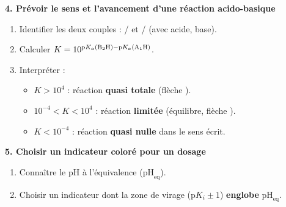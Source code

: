 \documentclass[11pt]{article}
\begin{document}
\begin{methode}
\textbf{4. Prévoir le sens et l'avancement d'une réaction acido-basique}
\begin{enumerate}
  \item Identifier les deux couples : / et / (avec  acide,  base).
  \item Calculer $K = 10^{\mathrm{p}K_{a}(\ce{B2H}) - \mathrm{p}K_{a}(\ce{A1H})}$.
  \item Interpréter :
  \begin{itemize}
    \item $K > 10^4$ : réaction \textbf{quasi totale} (flèche \ce{->}).
    \item $10^{-4} < K < 10^4$ : réaction \textbf{limitée} (équilibre, flèche \ce{<=>}).
    \item $K < 10^{-4}$ : réaction \textbf{quasi nulle} dans le sens écrit.
  \end{itemize}
\end{enumerate}

\textbf{5. Choisir un indicateur coloré pour un dosage}
\begin{enumerate}
  \item Connaître le pH à l'équivalence ($\mathrm{pH}_{\text{eq}}$).
  \item Choisir un indicateur dont la zone de virage ($\mathrm{p}K_i \pm 1$) \textbf{englobe} $\mathrm{pH}_{\text{eq}}$.
\end{enumerate}
\end{methode}
\end{document}
